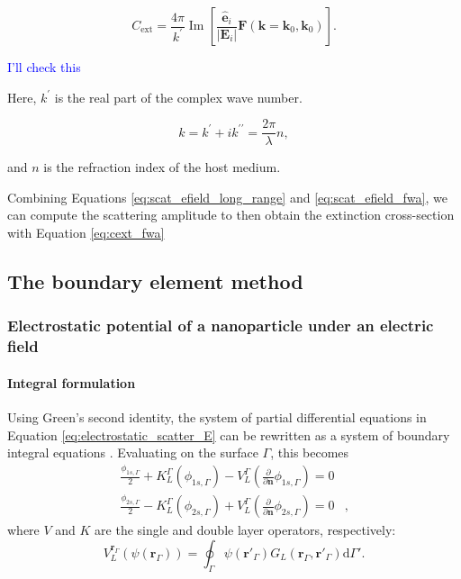 \begin{equation} \label{eq:cext_fwa}
    C_\text{ext} = \frac{4\pi}{k^\prime} \operatorname{Im} \left[ \frac{\mathbf{\hat{e}}_i}{|\mathbf{E}_i|}\mathbf{F}(\mathbf{k}=\mathbf{k}_0, \mathbf{k}_0) \right].
\end{equation}


{\color{red}{Chris in Mishenko 2007 paper the equation is not exactly the same 
(look eq 87 in paper), do you have that derivation? How you got to the eq 7.22 
 in your thesis?.}\textcolor{blue}{I'll check this}}


Here, $k^\prime$ is the real part of the complex wave number. 

\begin{equation}
    k = k^\prime + ik^{\prime\prime} = \frac{2\pi}{\lambda} n,
\end{equation}

and $n$ is the refraction index of the host medium.

Combining Equations \eqref{eq:scat_efield_long_range} and \eqref{eq:scat_efield_fwa},
we can compute the scattering amplitude to then obtain the extinction cross-section 
with Equation \eqref{eq:cext_fwa}


\subsection{The boundary element method} \label{sec:lspr_bem}

\subsubsection{Electrostatic potential of a nanoparticle under an electric field} \label{sec:pot_elec_field}

\paragraph{Integral formulation}

Using Green's second identity, the system of partial differential equations 
in Equation \eqref{eq:electrostatic_scatter_E} can be rewritten as a system 
of boundary integral equations \cite{BrebbiaDominguez1992}. Evaluating on the surface $\Gamma$, this
becomes
%
\begin{align} \label{eq:integral_eq_lspr_nobc}
\frac{\phi_{1s,\Gamma}}{2}+ K_{L}^{\Gamma}(\phi_{1s,\Gamma}) - V_{L}^{\Gamma} \left(\frac{\partial}{\partial \mathbf{n}}\phi_{1s,\Gamma} \right) = 0&  \nonumber \\
\frac{\phi_{2s,\Gamma}}{2} - K_{L}^{\Gamma}(\phi_{2s,\Gamma}) + V_{L}^{\Gamma} \left( \frac{\partial}{\partial \mathbf{n}} \phi_{2s,\Gamma} \right) = 0&,
\end{align}
%
where $V$ and $K$ are the single and double layer operators, respectively:
%
\begin{equation}\label{eq:single_layer}
V^{\mathbf{r}_\Gamma}_L (\psi(\mathbf{r}_\Gamma)) = \oint_\Gamma \psi(\mathbf{r}'_\Gamma) G_L(\mathbf{r}_\Gamma, \mathbf{r}'_\Gamma) \text{d} \Gamma'.
\end{equation}

